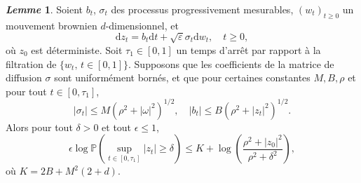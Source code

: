 \documentclass[12pt,a4paper,twoside]{report}%
\theoremstyle{definition}
\newtheorem{lem}[dfn]{\textit{Lemme}}
\numberwithin{equation}{section}
\begin{document}
	 	\begin{lem}\label{lem:3.2.9}
	 	Soient \(b_t\), \(\sigma_t\) des processus progressivement mesurables, \((w_t)_{t \geq 0}\) un mouvement brownien \(d\)-dimensionnel, et
	 	\[
	 	\mathrm{d} z_t = b_t \mathrm{d}t + \sqrt{\varepsilon} \sigma_t \mathrm{d} w_t, \quad t \geq 0,
	 	\]
	 	où \(z_0\) est déterministe. Soit \(\tau_1 \in [0,1]\) un temps d'arrêt par rapport à la filtration de \(\{w_t,\, t \in [0,1]\}\). Supposons que les coefficients de la matrice de diffusion \(\sigma\) sont uniformément bornés, et que pour certaines constantes \(M, B, \rho\) et pour tout \(t \in [0, \tau_1]\),
	 	\[
	 	|\sigma_t| \leq M (\rho^2 + |\omega|^2)^{1/2}, \quad |b_t| \leq B (\rho^2 + |z_t|^2)^{1/2}.
	 	\]
	 	Alors pour tout \(\delta > 0\) et tout \(\epsilon \leq 1\),
	 	\[
	 	\epsilon \log \mathbb{P} \left( \sup_{t \in [0,\tau_1]} |z_t| \geq \delta \right)
	 	\leq K + \log \left( \frac{\rho^2 + |z_0|^2}{\rho^2 + \delta^2} \right),
	 	\]
	 	où \(K = 2B + M^2 (2 + d)\).
	 	\end{lem}
\end{document}

